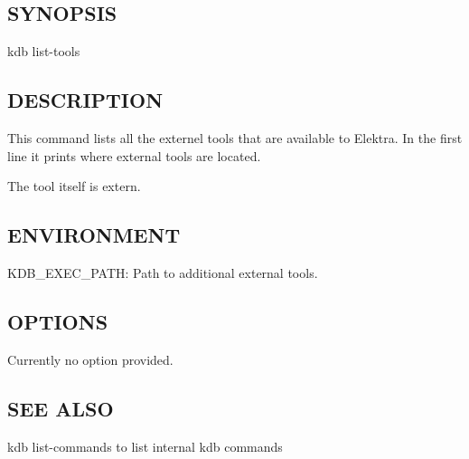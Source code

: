 \subsection*{S\+Y\+N\+O\+P\+S\+IS}

{\ttfamily kdb list-\/tools}

\subsection*{D\+E\+S\+C\+R\+I\+P\+T\+I\+ON}

This command lists all the externel tools that are available to Elektra. In the first line it prints where external tools are located.

The tool itself is extern.

\subsection*{E\+N\+V\+I\+R\+O\+N\+M\+E\+NT}


\begin{DoxyItemize}
\item {\ttfamily K\+D\+B\+\_\+\+E\+X\+E\+C\+\_\+\+P\+A\+TH}\+: Path to additional external tools.
\end{DoxyItemize}

\subsection*{O\+P\+T\+I\+O\+NS}

Currently no option provided.

\subsection*{S\+EE A\+L\+SO}


\begin{DoxyItemize}
\item {\ttfamily kdb list-\/commands} to list internal kdb commands 
\end{DoxyItemize}